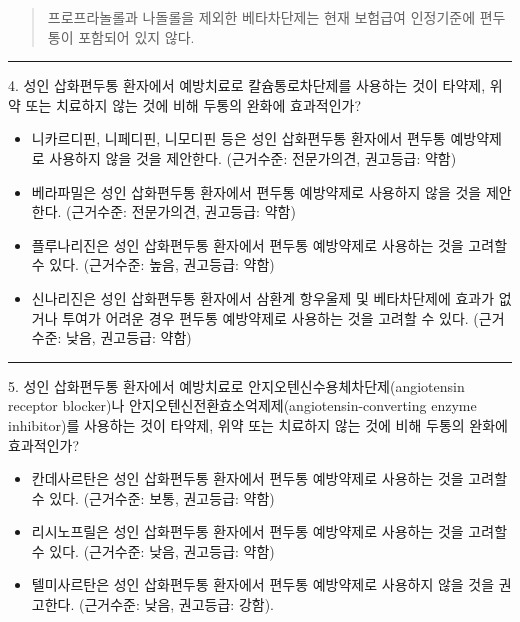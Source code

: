 \documentclass[]{book}
\begin{document}
\begin{quote}
프로프라놀롤과 나돌롤을 제외한 베타차단제는 현재 보험급여 인정기준에 편두통이 포함되어 있지 않다.
\end{quote}

\begin{center}\rule{0.5\linewidth}{\linethickness}\end{center}

4. 성인 삽화편두통 환자에서 예방치료로 칼슘통로차단제를 사용하는 것이 타약제, 위약 또는 치료하지 않는 것에 비해 두통의 완화에 효과적인가?

\begin{itemize}
\item
  니카르디핀, 니페디핀, 니모디핀 등은 성인 삽화편두통 환자에서 편두통 예방약제로 사용하지 않을 것을 제안한다. (근거수준: 전문가의견, 권고등급: 약함)
\item
  베라파밀은 성인 삽화편두통 환자에서 편두통 예방약제로 사용하지 않을 것을 제안한다. (근거수준: 전문가의견, 권고등급: 약함)
\item
  플루나리진은 성인 삽화편두통 환자에서 편두통 예방약제로 사용하는 것을 고려할 수 있다. (근거수준: 높음, 권고등급: 약함)
\item
  신나리진은 성인 삽화편두통 환자에서 삼환계 항우울제 및 베타차단제에 효과가 없거나 투여가 어려운 경우 편두통 예방약제로 사용하는 것을 고려할 수 있다. (근거수준: 낮음, 권고등급: 약함)
\end{itemize}

\begin{center}\rule{0.5\linewidth}{\linethickness}\end{center}

5. 성인 삽화편두통 환자에서 예방치료로 안지오텐신수용체차단제(angiotensin receptor blocker)나 안지오텐신전환효소억제제(angiotensin-converting enzyme inhibitor)를 사용하는 것이 타약제, 위약 또는 치료하지 않는 것에 비해 두통의 완화에 효과적인가?

\begin{itemize}
\item
  칸데사르탄은 성인 삽화편두통 환자에서 편두통 예방약제로 사용하는 것을 고려할 수 있다. (근거수준: 보통, 권고등급: 약함)
\item
  리시노프릴은 성인 삽화편두통 환자에서 편두통 예방약제로 사용하는 것을 고려할 수 있다. (근거수준: 낮음, 권고등급: 약함)
\item
  텔미사르탄은 성인 삽화편두통 환자에서 편두통 예방약제로 사용하지 않을 것을 권고한다. (근거수준: 낮음, 권고등급: 강함).
\end{itemize}
\end{document}
